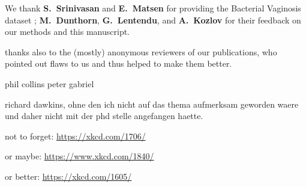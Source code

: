 We thank \textbf{S.~Srinivasan} and \textbf{E.~Matsen}
for providing the Bacterial Vaginosis dataset \citep{Srinivasan2012};
\textbf{M.~Dunthorn}, \textbf{G.~Lentendu}, %
and \textbf{A.~Kozlov}
for their feedback on our methods and this manuscript.

thanks also to the (mostly) anonymous reviewers of our publications,
who pointed out flaws to us and thus helped to make them better.


phil collins peter gabriel

richard dawkins, ohne den ich nicht auf das thema aufmerksam geworden waere und daher nicht mit der phd stelle angefangen haette.


\todo{} \cite{Beer2018}


not to forget:
\url{https://xkcd.com/1706/}

or maybe:
\url{https://www.xkcd.com/1840/}

or better:
\url{https://xkcd.com/1605/}


%

